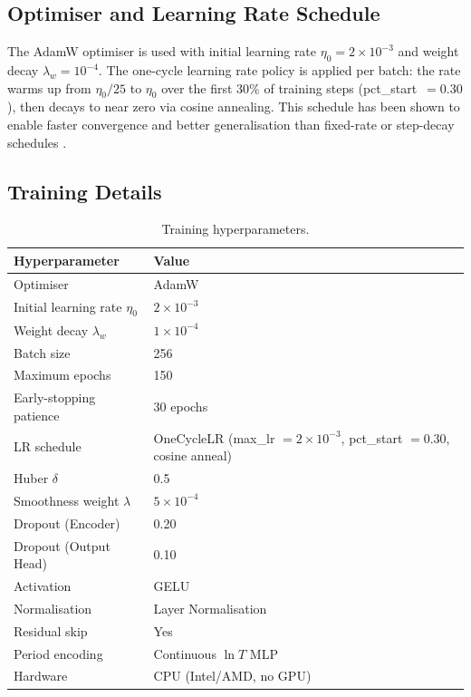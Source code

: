 \documentclass[12pt,a4paper]{article}
\begin{document}
\subsection{Optimiser and Learning Rate Schedule}

The AdamW optimiser \citep{Loshchilov2019} is used with initial learning rate
$\eta_0 = 2 \times 10^{-3}$ and weight decay $\lambda_w = 10^{-4}$.
The one-cycle learning rate policy \citep{Smith2019} is applied per batch:
the rate warms up from $\eta_0/25$ to $\eta_0$ over the first 30\% of
training steps (pct\_start~$= 0.30$), then decays to near zero via cosine
annealing.
This schedule has been shown to enable faster convergence and better
generalisation than fixed-rate or step-decay schedules
\citep{Smith2019}.

\subsection{Training Details}

\begin{table}[htbp]
\centering
\caption{Training hyperparameters.}
\label{tab:hparams}
\footnotesize
\renewcommand{\arraystretch}{1.15}
\begin{tabular}{ll}
\toprule
Hyperparameter & Value \\
\midrule
Optimiser & AdamW \\
Initial learning rate $\eta_0$ & $2 \times 10^{-3}$ \\
Weight decay $\lambda_w$ & $1 \times 10^{-4}$ \\
Batch size & 256 \\
Maximum epochs & 150 \\
Early-stopping patience & 30 epochs \\
LR schedule & OneCycleLR (max\_lr $= 2\times10^{-3}$, pct\_start $= 0.30$, cosine anneal) \\
Huber $\delta$ & 0.5 \\
Smoothness weight $\lambda$ & $5 \times 10^{-4}$ \\
Dropout (Encoder) & 0.20 \\
Dropout (Output Head) & 0.10 \\
Activation & GELU \\
Normalisation & Layer Normalisation \\
Residual skip & Yes \\
Period encoding & Continuous $\ln T$ MLP \\
Hardware & CPU (Intel/AMD, no GPU) \\
\bottomrule
\end{tabular}
\end{table}
\end{document}
